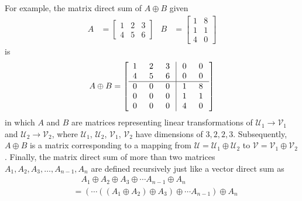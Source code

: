 For example, the matrix direct sum of $A \oplus B$ given
\begin{align*}
A &= 
\begin{bmatrix}
1 & 2 & 3 \\
4 & 5 & 6
\end{bmatrix}
& 
B &=
\begin{bmatrix}
1 & 8 \\
1 & 1 \\
4 & 0
\end{bmatrix}
\end{align*}
is
\begin{align*}
A \oplus B =
\left[\begin{array}{@{\;}wc{10pt}wc{10pt}wc{10pt}|wc{10pt}wc{10pt}}
1 & 2 & 3 & 0 & 0 \\
4 & 5 & 6 & 0 & 0 \\
\hline
0 & 0 & 0 & 1 & 8 \\
0 & 0 & 0 & 1 & 1 \\
0 & 0 & 0 & 4 & 0
\end{array}\right]
\end{align*}
in which $A$ and $B$ are matrices representing linear transformations of $\mathcal{U}_1 \to \mathcal{V}_1$ and $\mathcal{U}_2 \to \mathcal{V}_2$, where $\mathcal{U}_1$, $\mathcal{U}_2$, $\mathcal{V}_1$, $\mathcal{V}_2$ have dimensions of $3,2,2,3$. Subsequently, $A \oplus B$ is a matrix corresponding to a mapping from $\mathcal{U} = \mathcal{U}_1 \oplus \mathcal{U}_2$ to $\mathcal{V} = \mathcal{V}_1 \oplus \mathcal{V}_2$. Finally, the matrix direct sum of more than two matrices $A_1, A_2, A_3, \ldots, A_{n-1}, A_n$ are defined recursively just like a vector direct sum as
\begin{align*}
&\quad A_1 \oplus A_2 \oplus A_3 \oplus \cdots A_{n-1} \oplus A_n \\
&= (\cdots ((A_1 \oplus A_2) \oplus A_3) \oplus \cdots A_{n-1}) \oplus A_n
\end{align*}
